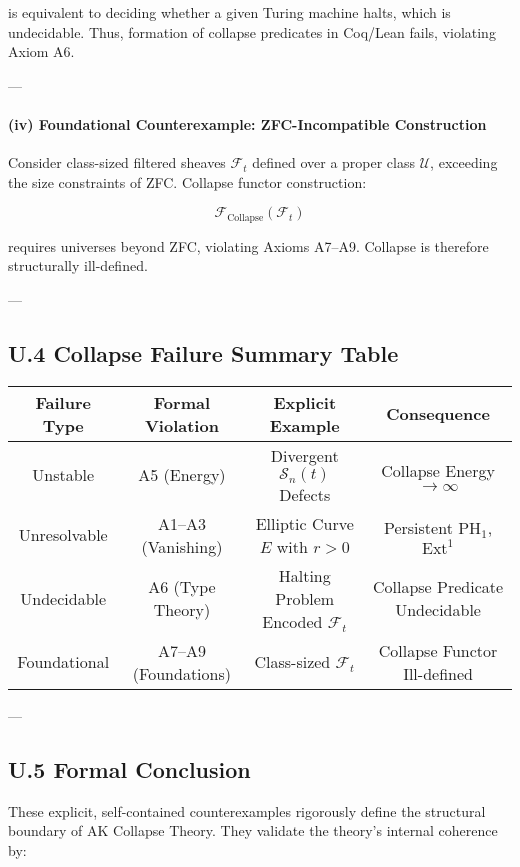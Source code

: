 \documentclass[11pt]{article}
\begin{document}
is equivalent to deciding whether a given Turing machine halts, which is undecidable.  
Thus, formation of collapse predicates in Coq/Lean fails, violating Axiom A6.

---

\paragraph{(iv) Foundational Counterexample: ZFC-Incompatible Construction}

Consider class-sized filtered sheaves $\mathcal{F}_t$ defined over a proper class $\mathcal{U}$, exceeding the size constraints of ZFC.  
Collapse functor construction:

\[
\mathcal{F}_{\mathrm{Collapse}}(\mathcal{F}_t)
\]

requires universes beyond ZFC, violating Axioms A7–A9.  
Collapse is therefore structurally ill-defined.

---

\subsection*{U.4 Collapse Failure Summary Table}

\begin{center}
\begin{tabular}{|c|c|c|c|}
\hline
\textbf{Failure Type} & \textbf{Formal Violation} & \textbf{Explicit Example} & \textbf{Consequence} \\
\hline
Unstable & A5 (Energy) & Divergent $\mathcal{S}_n(t)$ Defects & Collapse Energy $\to \infty$ \\
Unresolvable & A1–A3 (Vanishing) & Elliptic Curve $E$ with $r>0$ & Persistent $\mathrm{PH}_1$, $\mathrm{Ext}^1$ \\
Undecidable & A6 (Type Theory) & Halting Problem Encoded $\mathcal{F}_t$ & Collapse Predicate Undecidable \\
Foundational & A7–A9 (Foundations) & Class-sized $\mathcal{F}_t$ & Collapse Functor Ill-defined \\
\hline
\end{tabular}
\end{center}

---

\subsection*{U.5 Formal Conclusion}

These explicit, self-contained counterexamples rigorously define the structural boundary of AK Collapse Theory.  
They validate the theory's internal coherence by:
\end{document}
